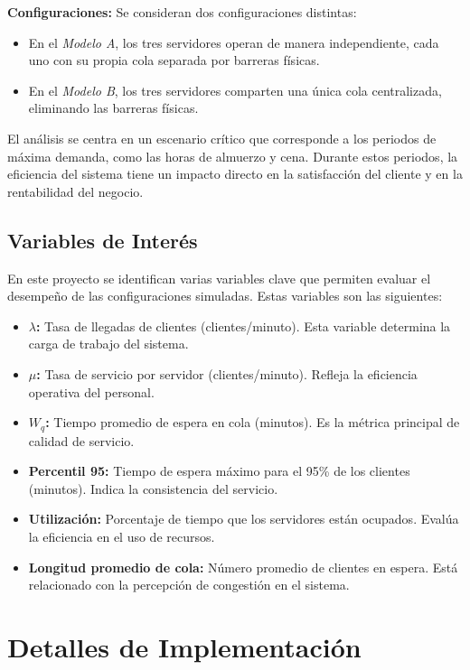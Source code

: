 \documentclass[a4paper,12pt]{article}
\begin{document}
\textbf{Configuraciones:} Se consideran dos configuraciones distintas:
\begin{itemize}
    \item En el \textit{Modelo A}, los tres servidores operan de manera independiente, cada uno con su propia cola separada por barreras físicas.
    \item En el \textit{Modelo B}, los tres servidores comparten una única cola centralizada, eliminando las barreras físicas.
\end{itemize}

El análisis se centra en un escenario crítico que corresponde a los periodos de máxima demanda, como las horas de almuerzo y cena. Durante estos periodos, la eficiencia del sistema tiene un impacto directo en la satisfacción del cliente y en la rentabilidad del negocio.

\subsection{Variables de Interés}

En este proyecto se identifican varias variables clave que permiten evaluar el desempeño de las configuraciones simuladas. Estas variables son las siguientes:

\begin{itemize}
    \item \textbf{$\lambda$:} Tasa de llegadas de clientes (clientes/minuto). Esta variable determina la carga de trabajo del sistema.
    \item \textbf{$\mu$:} Tasa de servicio por servidor (clientes/minuto). Refleja la eficiencia operativa del personal.
    \item \textbf{$W_q$:} Tiempo promedio de espera en cola (minutos). Es la métrica principal de calidad de servicio.
    \item \textbf{Percentil 95:} Tiempo de espera máximo para el 95\% de los clientes (minutos). Indica la consistencia del servicio.
    \item \textbf{Utilización:} Porcentaje de tiempo que los servidores están ocupados. Evalúa la eficiencia en el uso de recursos.
    \item \textbf{Longitud promedio de cola:} Número promedio de clientes en espera. Está relacionado con la percepción de congestión en el sistema.
\end{itemize}

\section{Detalles de Implementación}
\end{document}
